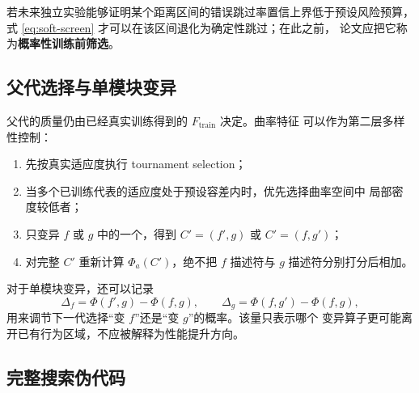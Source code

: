 \documentclass[UTF8,11pt]{ctexart}
\begin{document}
若未来独立实验能够证明某个距离区间的错误跳过率置信上界低于预设风险预算，
式 \eqref{eq:soft-screen} 才可以在该区间退化为确定性跳过；在此之前，
论文应把它称为\textbf{概率性训练前筛选}。

\subsection{父代选择与单模块变异}

父代的质量仍由已经真实训练得到的 \(F_{\mathrm{train}}\) 决定。曲率特征
可以作为第二层多样性控制：
\begin{enumerate}
    \item 先按真实适应度执行 tournament selection；
    \item 当多个已训练代表的适应度处于预设容差内时，优先选择曲率空间中
    局部密度较低者；
    \item 只变异 \(f\) 或 \(g\) 中的一个，得到
    \(C'=(f',g)\) 或 \(C'=(f,g')\)；
    \item 对完整 \(C'\) 重新计算 \(\Phi_a(C')\)，绝不把
    \(f\) 描述符与 \(g\) 描述符分别打分后相加。
\end{enumerate}

对于单模块变异，还可以记录
\[
    \Delta_f
    =
    \Phi(f',g)-\Phi(f,g),
    \qquad
    \Delta_g
    =
    \Phi(f,g')-\Phi(f,g),
\]
用来调节下一代选择“变 \(f\)”还是“变 \(g\)”的概率。该量只表示哪个
变异算子更可能离开已有行为区域，不应被解释为性能提升方向。

\subsection{完整搜索伪代码}
\end{document}
